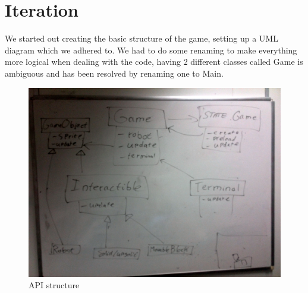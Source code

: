 \documentclass[a4paper,twoside,12pt]{article}
\begin{document}
\section{Iteration}
We started out creating the basic structure of the game, setting up a UML
diagram which we adhered to. We had to do some renaming to make everything
more logical when dealing with the code, having 2 different classes called
Game is ambiguous and has been resolved by renaming one to Main.
\\
\begin{figure}[H]
  \includegraphics[width=1\textwidth]{API}
  \caption{API structure} 
\end{figure}
\end{document}

